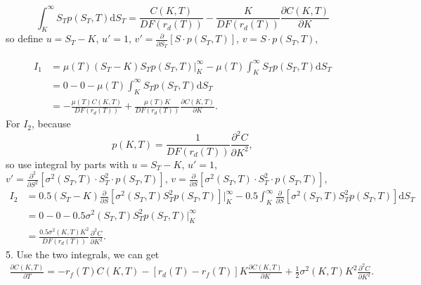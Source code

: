 \documentclass[12pt]{article}
\begin{document}
\begin{equation}
    \int_K^\infty S_Tp(S_T,T)\mathrm{d}S_T = \frac{C(K,T)}{DF(r_d(T))} - \frac{K}{DF(r_d(T))}\frac{\partial C(K,T)}{\partial K}
\end{equation}
so define $u = S_T - K$, $u'= 1$, $v'=\frac{\partial}{\partial S_T}[S \cdot p(S_T,T)]$, $v=S \cdot p(S_T,T)$, \par
\begin{equation}
\begin{split}
    I_1 &= \mu(T)(S_T-K)S_T p(S_T,T)\Big|^{\infty}_{K}-\mu(T)\int_K^\infty S_Tp(S_T,T)\mathrm{d}S_T \\
        &=0-0-\mu(T)\int_K^\infty S_Tp(S_T,T)\mathrm{d}S_T \\
        &=-\frac{\mu(T)C(K,T)}{DF(r_d(T))} + \frac{\mu(T)K}{DF(r_d(T))}\frac{\partial C(K,T)}{\partial K}.
\end{split}
\end{equation}
For $I_2$, because
\begin{equation}
    p(K,T)=\frac{1}{DF(r_d(T))}\frac{\partial^2 C}{\partial K^2},
\end{equation}
so use integral by parts with $u=S_T-K$, $u'=1$, $v'=\frac{\partial^2}{\partial S^2}[\sigma^2(S_T,T)\cdot S^2_T\cdot p(S_T,T)]$, $v=\frac{\partial}{\partial S}[\sigma^2(S_T,T)\cdot S^2_T\cdot p(S_T,T)]$,
\begin{equation}
\begin{split}
    I_2 &= 0.5(S_T-K)\frac{\partial}{\partial S}\left[\sigma^2(S_T,T) S^2_T p(S_T,T)\right]\Big|^{\infty}_{K} - 0.5\int_K^\infty \frac{\partial}{\partial S}\left[\sigma^2(S_T,T) S^2_T p(S_T,T)\right] \mathrm{d}S_T \\
        &= 0 - 0 - 0.5\sigma^2(S_T,T) S^2_T p(S_T,T)\Big|^\infty_K\\
        &= \frac{0.5\sigma^2(K,T)K^2}{DF(r_d(T))}\frac{\partial^2 C}{\partial K^2}.
\end{split}
\end{equation}
5. Use the two integrals, we can get 
\begin{equation}
\begin{split}
    \frac{\partial C(K,T)}{\partial T}= -r_f(T)C(K,T) - [r_d(T)-r_f(T)]K\frac{\partial C(K,T)}{\partial K} + \frac{1}{2}\sigma^2(K,T)K^2\frac{\partial^2 C}{\partial K^2}.
\end{split}
\end{equation}
\end{document}
